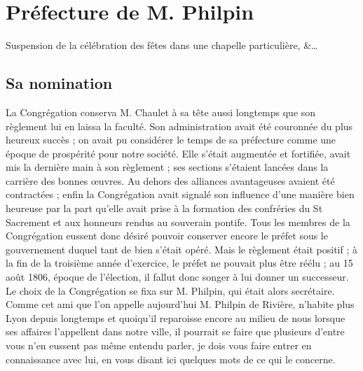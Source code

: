 \chapter{Préfecture de M. Philpin}
\begin{center}
Suspension de la célébration des fêtes dans une chapelle particulière, \&…
\end{center}

\section*{Sa nomination}
La Congrégation conserva M. Chaulet à sa tête aussi longtemps que son règlement lui en laissa la faculté. Son administration avait été couronnée du plus heureux succès ; on avait pu considérer le temps de sa préfecture comme une époque de prospérité pour notre société. Elle s'était augmentée et fortifiée, avait mis la dernière main à son règlement ; ses sections s'étaient lancées dans la carrière des bonnes œuvres. Au dehors des alliances avantageuses avaient été contractées ; enfin la Congrégation avait signalé son influence d'une manière bien heureuse par la part qu'elle avait prise à la formation des confréries du St Sacrement et aux honneurs rendus au souverain pontife. Tous les membres de la Congrégation
eussent donc désiré pouvoir conserver encore le préfet sous le gouvernement duquel tant de bien s'était opéré. Mais le règlement était positif ; à la fin de la troisième année d'exercice, le préfet ne pouvait plus être réélu ; au 15 août 1806, époque de l'élection, il fallut donc songer à lui donner un successeur. Le choix de la Congrégation se fixa sur M. Philpin, qui était alors secrétaire. Comme cet ami que l'on appelle aujourd'hui M. Philpin de Rivière, n'habite plus Lyon depuis longtemps et quoiqu'il reparoisse encore au milieu de nous lorsque ses affaires l'appellent dans notre ville, il pourrait se faire que plusieurs d'entre vous n'en eussent pas même entendu parler, je dois vous faire entrer en connaissance avec lui, en vous disant ici quelques mots de ce qui le concerne.

